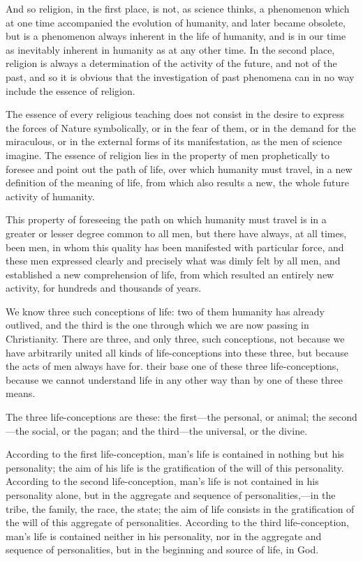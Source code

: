 \documentclass{book}
\begin{document}
And so religion, in the first place, is not, as science thinks, a phenomenon which at one time accompanied the evolution of humanity, and later became obsolete, but is a phenomenon always inherent in the life of humanity, and is in our time as inevitably inherent in humanity as at any other time. In the second place, religion is always a determination of the activity of the future, and not of the past, and so it is obvious that the investigation of past phenomena can in no way include the essence of religion.

The essence of every religious teaching does not consist in the desire to express the forces of Nature symbolically, or in the fear of them, or in the demand for the miraculous, or in the external forms of its manifestation, as the men of science imagine. The essence of religion lies in the property of men prophetically to foresee and point out the path of life, over which humanity must travel, in a new definition of the meaning of life, from which also results a new, the whole future activity of humanity.

This property of foreseeing the path on which humanity must travel is in a greater or lesser degree common to all men, but there have always, at all times, been men, in whom this quality has been manifested with particular force, and these men expressed clearly and precisely what was dimly felt by all men, and established a new comprehension of life, from which resulted an entirely new activity, for hundreds and thousands of years.

We know three such conceptions of life: two of them humanity has already outlived, and the third is the one through which we are now passing in Christianity. There are three, and only three, such conceptions, not because we have arbitrarily united all kinds of life-conceptions into these three, but because the acts of men always have for. their base one of these three life-conceptions, because we cannot understand life in any other way than by one of these three means.

The three life-conceptions are these: the first—the personal, or animal; the second—the social, or the pagan; and the third—the universal, or the divine.

According to the first life-conception, man’s life is contained in nothing but his personality; the aim of his life is the gratification of the will of this personality. According to the second life-conception, man’s life is not contained in his personality alone, but in the aggregate and sequence of personalities,—in the tribe, the family, the race, the state; the aim of life consists in the gratification of the will of this aggregate of personalities. According to the third life-conception, man’s life is contained neither in his personality, nor in the aggregate and sequence of personalities, but in the beginning and source of life, in God.
\end{document}

